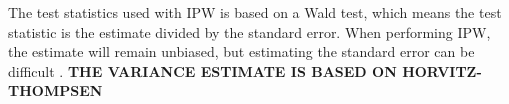 The test statistics used with IPW is based on a Wald test\cite{survivalVignette}, which means the test statistic is the estimate divided by the standard error. When performing IPW, the estimate will remain unbiased, but estimating the standard error can be difficult \cite{austin2016variance}. \textbf{THE VARIANCE ESTIMATE IS BASED ON HORVITZ-THOMPSEN}





